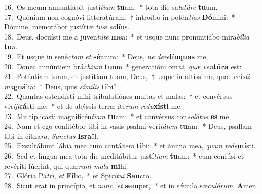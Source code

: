 {16.~}Os meum annuntiábit justí\textit{ti}\textit{am} \textbf{tu}am:~* tota die sa\textit{lu}\textit{tá}\textit{re} \textbf{tu}um.\\
{17.~}Quóniam non cognóvi litteratúram,~† introíbo in potén\textit{ti}\textit{as} \textbf{Dó}mini:~* Dómine, memorábor justítiæ \textit{tu}\textit{æ} \textit{so}\textbf{lí}us.\\
{18.~}Deus, docuísti me a juven\textit{tú}\textit{te} \textbf{me}a:~* et usque nunc pronuntiábo mira\textit{bí}\textit{li}\textit{a} \textbf{tu}a.\\
{19.~}Et usque in sené\textit{ctam} \textit{et} \textbf{sé}nium:~* Deus, \textit{ne} \textit{de}\textit{re}\textbf{lín}\textbf{quas} me,\\
{20.~}Donec annúntiem brá\textit{chi}\textit{um} \textbf{tu}um~* generatióni om\textit{ni}, \textit{quæ} \textit{ven}\textbf{tú}\textbf{ra} est:\\
{21.~}Poténtiam tuam, et justítiam tuam, Deus,~† usque in altíssima, quæ fecí\textit{sti} \textit{ma}\textbf{gná}lia:~* Deus, quis \textit{sí}\textit{mi}\textit{lis} \textbf{ti}bi?\\
{22.~}Quantas ostendísti mihi tribulatiónes multas et malas:~† et convérsus vi\textit{vi}\textit{fi}\textbf{cá}sti me:~* et de abýssis terræ íte\textit{rum} \textit{re}\textit{du}\textbf{xí}\textbf{sti} me:\\
{23.~}Multiplicásti magnificén\textit{ti}\textit{am} \textbf{tu}am:~* et convérsus con\textit{so}\textit{lá}\textit{tus} \textbf{es} me.\\
{24.~}Nam et ego confitébor tibi in vasis psalmi veri\textit{tá}\textit{tem} \textbf{tu}am:~* Deus, psallam tibi in cítha\textit{ra}, \textit{San}\textit{ctus} \textbf{Is}\textbf{ra}ël.\\
{25.~}Exsultábunt lábia mea cum cantá\textit{ve}\textit{ro} \textbf{ti}bi:~* et ánima mea, \textit{quam} \textit{re}\textit{de}\textbf{mí}sti.\\
{26.~}Sed et lingua mea tota die meditábitur justí\textit{ti}\textit{am} \textbf{tu}am:~* cum confúsi et revériti fúerint, qui quæ\textit{runt} \textit{ma}\textit{la} \textbf{mi}hi.\\
{27.~}Glória Pa\textit{tri}, \textit{et} \textbf{Fí}lio,~* et Spi\textit{rí}\textit{tu}\textit{i} \textbf{San}cto.\\
{28.~}Sicut erat in princípio, et \textit{nunc}, \textit{et} \textbf{sem}per,~* et in sǽcula sæ\textit{cu}\textit{ló}\textit{rum}. \textbf{A}men.\\
